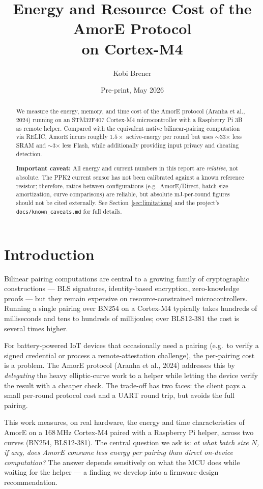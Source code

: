 \documentclass[11pt,a4paper]{article}
\title{Energy and Resource Cost of the AmorE Protocol \\ on Cortex-M4}
\author{Kobi Brener}
\date{Pre-print, May 2026}
\begin{document}
\maketitle

\begin{abstract}
We measure the energy, memory, and time cost of the AmorE protocol
(Aranha et al., 2024) running on an STM32F407 Cortex-M4 microcontroller
with a Raspberry Pi 3B as remote helper. Compared with the equivalent
native bilinear-pairing computation via RELIC, AmorE incurs roughly
$1.5\times$ active-energy per round but uses $\sim$33$\times$ less
SRAM and $\sim$3$\times$ less Flash, while additionally providing input
privacy and cheating detection.

\bigskip
\noindent\textbf{Important caveat:} All energy and current numbers
in this report are \emph{relative}, not absolute. The PPK2 current
sensor has not been calibrated against a known reference resistor;
therefore, ratios between configurations (e.g.\ AmorE/Direct,
batch-size amortization, curve comparisons) are reliable, but
absolute mJ-per-round figures should not be cited externally. See
Section~\ref{sec:limitations} and the project's
\texttt{docs/known\_caveats.md} for full details.
\end{abstract}

\section{Introduction}

Bilinear pairing computations are central to a growing family of
cryptographic constructions --- BLS signatures, identity-based
encryption, zero-knowledge proofs --- but they remain expensive
on resource-constrained microcontrollers. Running a single pairing
over BN254 on a Cortex-M4 typically takes hundreds of milliseconds
and tens to hundreds of millijoules; over BLS12-381 the cost is
several times higher.

For battery-powered IoT devices that occasionally need a pairing
(e.g.\ to verify a signed credential or process a remote-attestation
challenge), the per-pairing cost is a problem. The AmorE protocol
(Aranha et al., 2024) addresses this by \emph{delegating} the
heavy elliptic-curve work to a helper while letting the device verify
the result with a cheaper check. The trade-off has two faces: the
client pays a small per-round protocol cost and a UART round trip,
but avoids the full pairing.

This work measures, on real hardware, the energy and time
characteristics of AmorE on a 168\,MHz Cortex-M4 paired with a
Raspberry Pi helper, across two curves (BN254, BLS12-381). The
central question we ask is: \emph{at what batch size $N$, if any,
does AmorE consume less energy per pairing than direct on-device
computation?} The answer depends sensitively on what the MCU does
while waiting for the helper --- a finding we develop into a
firmware-design recommendation.
\end{document}
